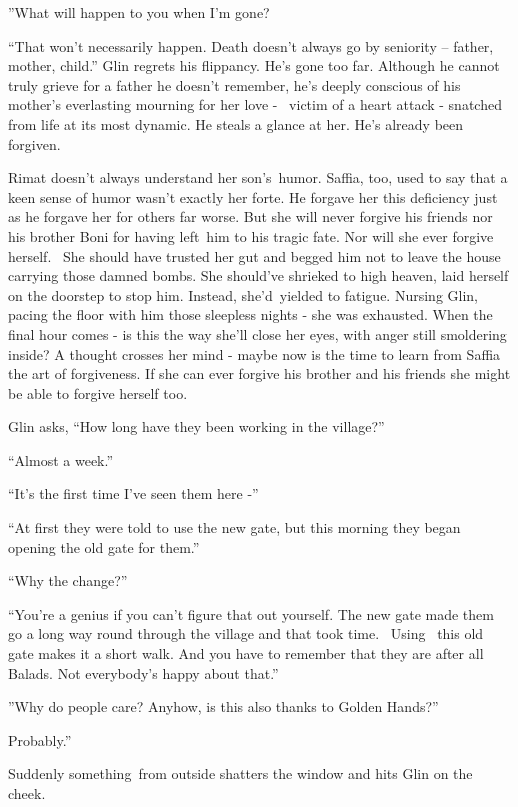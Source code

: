 \documentclass[letterpaper]{article}
\begin{document}
{}''What will happen to you when I'm gone?{\textquotedbl}

{}``That won't necessarily happen. Death doesn't always go by seniority -- father, mother, child.'' Glin regrets his
flippancy. He's gone too far. Although he cannot truly grieve for a father he doesn't remember, he's deeply conscious
of his mother's everlasting mourning for her love - \ victim of a heart attack - snatched from life at its most
dynamic. He steals a glance at her. He's already been forgiven.

{Rimat doesn't always understand her son's~humor. Saffia, too, used to
say that a keen sense of humor wasn't exactly her forte. }He forgave her this deficiency just as he forgave her for
others far worse. But she will never forgive his friends nor his brother Boni for having left~him to his tragic fate.
Nor will she ever forgive herself.~ She should have trusted her gut and begged him not to leave the house carrying
those damned bombs. She should've shrieked to high heaven, laid herself on the doorstep to stop him. Instead,
she'd~yielded to fatigue. Nursing Glin, pacing the floor with him those sleepless nights - she was exhausted. When the
final hour comes - is this the way she'll close her eyes, with anger still smoldering inside? A thought crosses her
mind - maybe now is the time to learn from Saffia the art of forgiveness. If she can ever forgive his brother
and{ his friends she might be able to forgive herself too. }

{Glin asks, ``How long have they been working in the village?'' }

{{}``Almost a week.'' }

{{}``It's the first time I've seen them here -'' }

{{}``}At first{ they
were told to use the new gate, but this morning they began opening the old gate for them.'' }

{{}``Why}{
}{the change?'' }

{}``You're a genius if you can't figure that out yourself. The new gate made them go a long way {round
through }the village and that took time. \ Using \ this old gate makes it a short walk. And you have to remember that
they are after all Balads. Not everybody's happy about that.''{ }

{{}''Why do people care? Anyhow, is this }also
{thanks to }Golden
Hands{?''}

{{\textquotedbl}Probably.''}

{Suddenly something~from outside shatters the window and hits Glin on
the cheek.}
\end{document}
